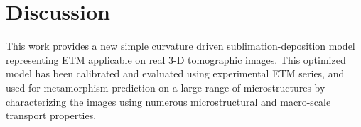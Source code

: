 \documentclass[draft,ms]{agujournal2019}
\begin{document}
\section{Discussion}
\label{sec:disc}

This work provides a new simple curvature driven sublimation-deposition model representing ETM applicable on real 3-D tomographic images. This optimized model has been calibrated and evaluated using experimental ETM series, and used for metamorphism prediction on a large range of microstructures by characterizing the images using numerous microstructural and macro-scale transport properties.

\end{document}
